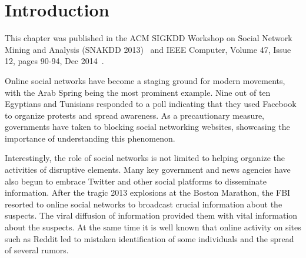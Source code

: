 \section{Introduction}
This chapter was published in the ACM SIGKDD Workshop on Social Network
Mining and Analysis (SNAKDD 2013)~\cite{jin2013epidemiological}
and IEEE Computer, Volume 47, Issue 12, pages 90-94, Dec 2014~\cite{jin2014modeling}.

Online social networks have become a staging ground for modern
movements, with the Arab Spring being the most prominent example.
Nine out of ten Egyptians and Tunisians responded to a poll indicating
that they used Facebook to organize protests and spread awareness.
As a precautionary measure, governments have taken to
blocking social networking websites, showcasing the importance of understanding
this phenomenon.

Interestingly, the role of social networks is not limited to
helping organize the activities of disruptive elements.
Many key government and news
agencies have also begun to embrace Twitter and other social platforms
to disseminate information.
After the tragic 2013 explosions at the Boston Marathon, the
FBI resorted to online social networks to broadcast crucial information
about the suspects. The viral diffusion of information provided them with
vital information about the suspects.
At the same time it is well known
that online activity on sites
such as Reddit led to mistaken identification of some individuals
and the spread of several rumors.

